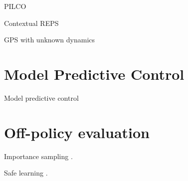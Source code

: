 \documentclass[12 pt]{article}
\begin{document}
PILCO \cite{deisenroth2011pilco}

Contextual REPS \cite{kupcsik2013data}

GPS with unknown dynamics \cite{levine2014learning}

\section{Model Predictive Control}
Model predictive control

\section{Off-policy evaluation}

Importance sampling \cite{silver2014deterministic} \cite{levine2013guided}.

Safe learning \cite{thomas2015off-policy}.



\end{document}
